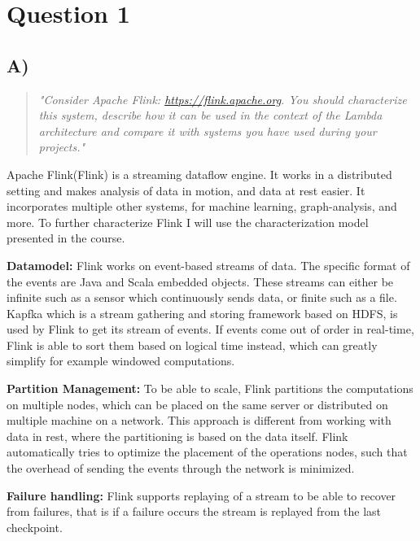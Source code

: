 \section{Question 1}

\subsection{A)}
\begin{quote}
	\textit{"Consider	Apache	Flink: \url{https://flink.apache.org}.	You	should	characterize	this	system,	describe	how	it	can	be	used	in	the	context	of	the	Lambda	architecture	and	compare	it	with	systems	you	have	used	during	your	projects."}
\end{quote}
Apache Flink(Flink) is a streaming dataflow engine. It works in a distributed setting and makes analysis of data in motion, and data at rest easier. It incorporates multiple other systems, for machine learning, graph-analysis, and more. To further characterize Flink I will use the characterization model presented in the course.

\newpar \textbf{Datamodel:} Flink works on event-based streams of data. The specific format of the events are Java and Scala embedded objects. These streams can either be infinite such as a sensor which continuously sends data, or finite such as a file. Kapfka which is a stream gathering and storing framework based on HDFS, is used by Flink to get its stream of events\cite{confluent-flink}. If events come out of order in real-time, Flink is able to sort them based on logical time instead, which can greatly simplify for example windowed computations.

\newpar \textbf{Partition Management:} To be able to scale, Flink partitions the computations on multiple nodes, which can be placed on the same server or distributed on multiple machine on a network. This approach is different from working with data in rest, where the partitioning is based on the data itself. Flink automatically tries to optimize the placement of the operations nodes, such that the overhead of sending the events through the network is minimized\cite{official-flink}.

\newpar \textbf{Failure handling:} Flink supports replaying of a stream to be able to recover from failures, that is if a failure occurs the stream is replayed from the last checkpoint.

